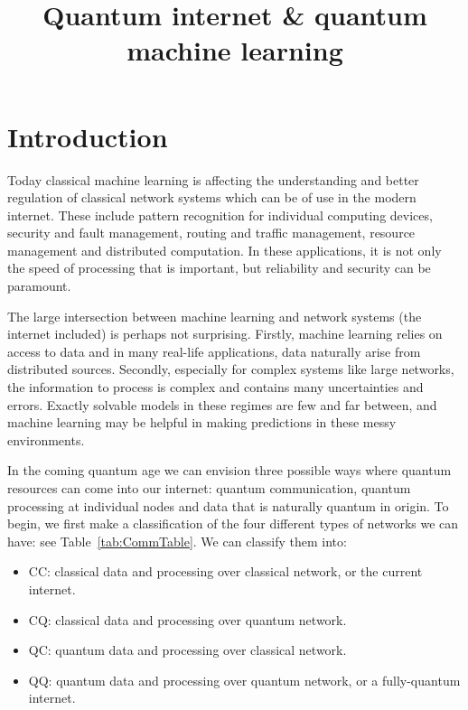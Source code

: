 \documentclass[twocolumn, aps, rmp, amsmath, amssymb, nofootinbib, superscriptaddress, longbibliography, floatfix, table-of-contents, eqsecnum]{revtex4-2}
\title{Quantum internet \& quantum machine learning}
\begin{document}
\maketitle

\tableofcontents 

\section{Introduction}

Today classical machine learning is affecting the understanding and better regulation of classical network systems which can be of use in the modern internet. These include pattern recognition for individual computing devices, security and fault management, routing and traffic management, resource management and distributed computation. In these applications, it is not only the speed of processing that is important, but reliability and security can be paramount.

The large intersection between machine learning and network systems (the internet included) is perhaps not surprising. Firstly, machine learning relies on access to data and in many real-life applications, data naturally arise from distributed sources. Secondly, especially for complex systems like large networks, the information to process is complex and contains many uncertainties and errors. Exactly solvable models in these regimes are few and far between, and machine learning may be helpful in making predictions in these messy environments.

In the coming quantum age we can envision three possible ways where quantum resources can come into our internet: quantum communication, quantum processing at individual nodes and data that is naturally quantum in origin. To begin, we first make a classification of the four different types of networks we can have: see Table~\eqref{tab:CommTable}. We can classify them into:

\begin{itemize}
\item CC: classical data and processing over classical network, or the current internet.
\item CQ: classical data and processing over quantum network.
\item QC: quantum data and processing over classical network.
\item QQ: quantum data and processing over quantum network, or a fully-quantum internet.
\end{itemize}
\end{document}
